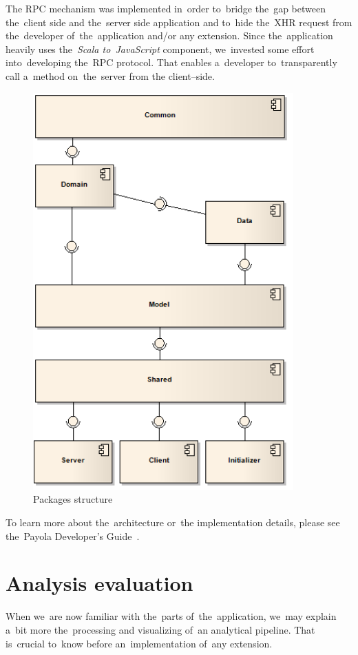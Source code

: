 The RPC mechanism was implemented in~order to~bridge the~gap between the~client 
side and the~server side application and to~hide the~XHR request from
the~developer of~the~application and/or any extension. Since the~application heavily
uses the~\emph{Scala to~JavaScript} component, we~invested some effort into~developing the~RPC 
protocol. That enables a~developer to~transparently call a~method on~the~server from 
the client--side. 

\begin{figure}
	\centering
	\includegraphics[width=100mm]{images/project_dependencies.png}
	\caption{Packages structure}
	\label{fig:packages-structure}
\end{figure}

To learn more about the~architecture or~the implementation details, please see the~Payola Developer's Guide~\cite{payola:dg}.

\section{Analysis evaluation}
When we~are now familiar with the~parts of~the~application, we~may explain a~bit more the~processing and visualizing of~an analytical pipeline. That is~crucial to~know before an~implementation of~any extension.


